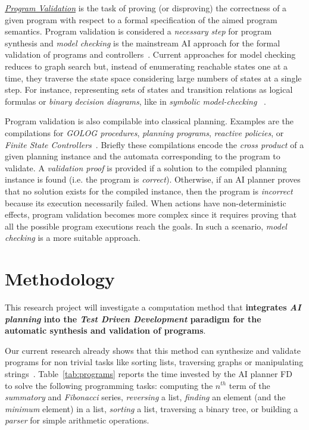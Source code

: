 \documentclass[10pt,a4paper]{paper}
\begin{document}
{\underline{\em Program Validation}} is the task of proving (or disproving) the correctness of a given program with respect to a formal specification of the aimed program semantics. Program validation is considered a {\em necessary step} for program synthesis and {\em model checking} is the mainstream AI approach for the formal validation of programs and controllers~\cite{clarke1999model}. Current approaches for model checking reduces to graph search but, instead of enumerating reachable states one at a time, they traverse the state space considering large numbers of states at a single step. For instance, representing sets of states and transition relations as logical formulas or {\em binary decision diagrams}, like in {\em symbolic model-checking} ~\cite{mcmillan1993symbolic}.

Program validation is also compilable into classical planning. Examples are the compilations for {\em GOLOG procedures}, {\em planning programs}, {\em reactive policies}, or {\em Finite State Controllers}~\cite{baier2007exploiting,Geffner:FSM:AAAI10,ivankovic2015optimal,sergio:aprograming:ijcai16,segovia:FSC:JAIR2018,segovia:programs:AIJ19}. Briefly these compilations encode the {\em cross product} of a given planning instance and the automata corresponding to the program to validate. A {\em validation proof} is provided if a solution to the compiled planning instance is found (i.e. the program is {\em correct}). Otherwise, if an AI planner proves that no solution exists for the compiled instance, then the program is {\em incorrect} because its execution necessarily failed. When actions have non-deterministic effects, program validation becomes more complex since it requires proving that all the possible program executions reach the goals. In such a scenario, {\em model checking} is a more suitable approach.
\newpage



\section{Methodology}
\label{sec:methodology}
This research project will investigate a computation method that {\bf integrates {\em AI planning} into the {\em Test Driven Development} paradigm for the automatic synthesis and validation of programs}. 

Our current research already shows that this method can synthesize and validate programs for non trivial tasks like sorting lists, traversing graphs or manipulating strings~\cite{jimenez2015computing,sergio:aprograming:icaps16,sergio:aprogramingb:ijcai16,sergio:aprograming:ijcai16,segovia2017generating,segovia:FSC:JAIR2018,segovia:programs:AIJ19}. Table~\ref{tab:programs} reports the time invested by the AI planner {\sc FD}~\cite{helmert2006fast} to solve the following programming tasks: computing the $n^{th}$ term of the {\em summatory} and  {\em Fibonacci} series, {\em reversing} a list, {\em finding} an element (and the {\em minimum} element) in a list, {\em sorting} a list, traversing a binary tree, or building a {\em parser} for simple arithmetic operations. 
 
\end{document}
